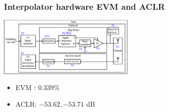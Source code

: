 \documentclass{sdkslides}
\begin{document}
\begin{frame}[t]
    \frametitle{Interpolator hardware EVM and ACLR}
    \begin{center}
        \includegraphics[width=0.5\textwidth]{Pics/outphasing_model_interp.eps}
    \end{center}
    \begin{figure}
        \begin{center}
            \qquad
        \end{center}
    \end{figure}
    \begin{itemize}
        \item EVM : $0.339\%$
        \item ACLR: $ -53.62, -53.71$ dB
    \end{itemize}
\end{frame}
\end{document}
